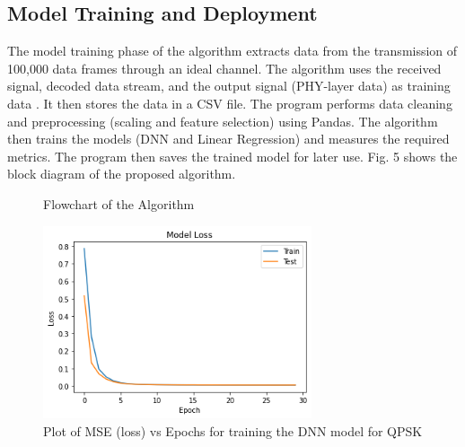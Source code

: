 \documentclass[conference]{IEEEtran}
\begin{document}
\subsection{Model Training and Deployment}
The model training phase of the algorithm extracts data from the transmission of 100,000 data frames through an ideal channel. The algorithm uses the received signal, decoded data stream, and the output signal (PHY-layer data) as training data \cite{b2}. It then stores the data in a CSV file. The program performs data cleaning and preprocessing (scaling and feature selection) using Pandas. The algorithm then trains the models (DNN and Linear Regression) and measures the required metrics. The program then saves the trained model for later use. Fig. 5 shows the block diagram of the proposed algorithm.


\begin{figure}[htbp]
\centering
\caption{Flowchart of the Algorithm}
\label{algo}
\end{figure}

\begin{figure}[htbp]
\centerline{\includegraphics[width=7.9cm]{loss_qpsk_v2.png}}
\caption{Plot of MSE (loss) vs Epochs for training the DNN model for QPSK}
\label{loss_qpsk}
\end{figure}
\end{document}
